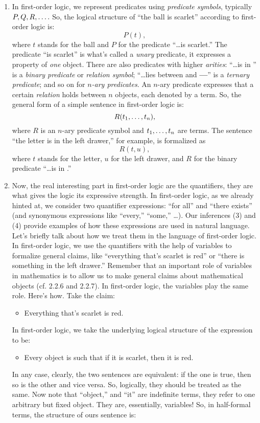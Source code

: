 \begin{enumerate}[\thesection.1]
		\item In first-order logic, we represent predicates using \emph{predicate symbols}, typically $P,Q,R, \mathellipsis.$ So, the logical structure of ``the ball is scarlet'' according to first-order logic is: \[P(t),\] where $t$ stands for the ball and $P$ for the predicate ``\dots is scarlet.'' The predicate ``is scarlet'' is what's called a \emph{unary} predicate, it expresses a property of \emph{one} object. There are also predicates with higher \emph{arities}: ``\dots is in \underline{\phantom{\dots}}'' is a \emph{binary predicate} or \emph{relation symbol}; ``\dots lies between \underline{\phantom{\dots}} and \textbf{---}'' is a \emph{ternary predicate}; and so on for \emph{$n$-ary predicates}. An $n$-ary predicate expresses that a certain \emph{relation} holds between $n$ objects, each denoted by a term. So, the general form of a simple sentence in first-order logic is: \[R(t_1, \mathellipsis, t_n),\] where $R$ is an $n$-ary predicate symbol and $t_1,\mathellipsis, t_n$ are terms. The sentence ``the letter is in the left drawer,'' for example, is formalized as \[R(t, u),\] where $t$ stands for the letter, $u$ for the left drawer, and $R$ for the binary predicate ``\dots is in \underline{\phantom{\dots}}.''
		
		\item Now, the real interesting part in first-order logic are the quantifiers, they are what gives the logic its expressive strength. In first-order logic, as we already hinted at, we consider two quantifier expressions: ``for all'' and ``there exists'' (and synonymous expressions like ``every,'' ``some,'' \dots). Our inferences (3) and (4) provide examples of how these expressions are used in natural language. Let's briefly talk about how we treat them in the language of first-order logic. In first-order logic, we use the quantifiers with the help of variables to formalize general claims, like ``everything that's scarlet is red'' or ``there is something in the left drawer.'' Remember that an important role of variables in mathematics is to allow us to make general claims about mathematical objects (cf. 2.2.6 and 2.2.7). In first-order logic, the variables play the same role. Here's how. Take the claim:
		\begin{itemize}
		\item Everything that's scarlet is red.
		\end{itemize}
In first-order logic, we take the underlying logical structure of the expression to be:
	\begin{itemize}
		\item Every object is such that if it is scarlet, then it is red.
	\end{itemize} 
		In any case, clearly, the two sentences are equivalent: if the one is true, then so is the other and vice versa.
		So, logically, they should be treated as the same.
		Now note that ``object,'' and ``it'' are indefinite terms, they refer to one arbitrary but fixed object.
		They are, essentially, variables! So, in half-formal terms, the structure of ours sentence is:
	\begin{itemize}
	

\end{itemize}
\end{enumerate}
